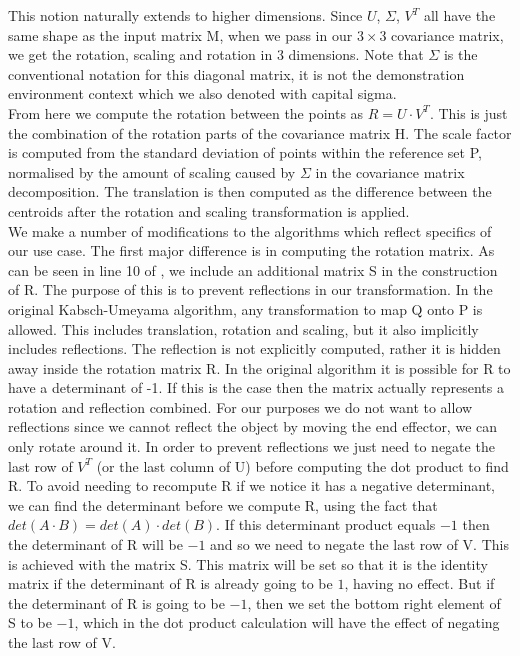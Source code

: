 This notion naturally extends to higher dimensions. Since $U$, $\Sigma$, $V^T$ all have the same shape as the input matrix M, when we pass in our $3 \times 3$ covariance matrix, we get the rotation, scaling and rotation in 3 dimensions. Note that $\Sigma$ is the conventional notation for this diagonal matrix, it is not the demonstration environment context which we also denoted with capital sigma.\\

From here we compute the rotation between the points as $R = U \cdot V^T$. This is just the combination of the rotation parts of the covariance matrix H. 
The scale factor is computed from the standard deviation of points within the reference set P, normalised by the amount of scaling caused by $\Sigma$ in the covariance matrix decomposition. The translation is then computed as the difference between the centroids after the rotation and scaling transformation is applied.\\

We make a number of modifications to the algorithms which reflect specifics of our use case. The first major difference is in computing the rotation matrix. As can be seen in line 10 of , we include an additional matrix S in the construction of R. The purpose of this is to prevent reflections in our transformation. In the original Kabsch-Umeyama algorithm, any transformation to map Q onto P is allowed. This includes translation, rotation and scaling, but it also implicitly includes reflections. The reflection is not explicitly computed, rather it is hidden away inside the rotation matrix R. In the original algorithm it is possible for R to have a determinant of -1. If this is the case then the matrix actually represents a rotation and reflection combined. For our purposes we do not want to allow reflections since we cannot reflect the object by moving the end effector, we can only rotate around it. In order to prevent reflections we just need to negate the last row of $V^T$ (or the last column of U) before computing the dot product to find R. To avoid needing to recompute R if we notice it has a negative determinant, we can find the determinant before we compute R, using the fact that $det(A \cdot B) = det(A) \cdot det(B)$. If this determinant product equals $-1$ then the determinant of R will be $-1$ and so we need to negate the last row of V. This is achieved with the matrix S. This matrix will be set so that it is the identity matrix if the determinant of R is already going to be $1$, having no effect. But if the determinant of R is going to be $-1$, then we set the bottom right element of S to be $-1$, which in the dot product calculation will have the effect of negating the last row of V.\\

